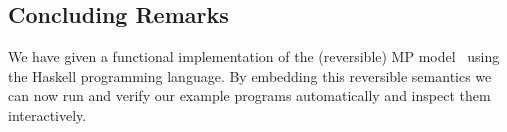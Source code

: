 \documentclass[runningheads,plain]{llncs}
\begin{document}
{%
%
%
%
%
%


\subsection{Concluding Remarks}\label{conclusion}

We have given a functional implementation of the (reversible) MP model~\cite{DBLP:conf/ppdp/MezzinaP17} using the Haskell
programming language. By embedding this reversible semantics we can now run and
verify our example programs automatically and inspect them
interactively.

}
\end{document}
